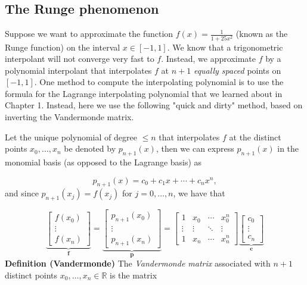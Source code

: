 \documentclass[12pt,a4paper]{article}
\def\bbR{ {\mathbb R} }
\begin{document}
\subsection{The Runge phenomenon}
Suppose we want to approximate the function $f(x) = \frac{1}{1 + 25x^2}$ (known as the Runge function) on the interval $x \in[-1, 1]$.  We know that a trigonometric interpolant will not converge very fast to $f$.  Instead, we approximate $f$ by a polynomial interpolant that interpolates $f$ at $n+1$ \emph{equally spaced} points on $[-1, 1]$.  One method to compute the interpolating polynomial is to use the formula for the Lagrange interpolating polynomial that we learned about in Chapter 1.  Instead, here we use the following "quick and dirty" method, based on inverting the Vandermonde matrix. 

Let the unique polynomial of degree $\leq n$ that interpolates $f$ at the distinct points $x_0, \ldots, x_{n}$ be denoted by $p_{n+1}(x)$, then we can express $p_{n+1}(x)$ in the monomial basis (as opposed to the Lagrange basis) as 

\[
p_{n+1}(x) = c_0 + c_1 x + \cdots + c_nx^n,
\]
and since $p_{n+1}(x_j) = f(x_j)$ for $j = 0, \ldots, n$, we have that

\[
\underbrace{\begin{bmatrix}
                    f(x_0) \\
                    \vdots \\
                    f(x_n)
                    \end{bmatrix}}_{\mathbf{f}} = 
\underbrace{ \begin{bmatrix}
                    p_{n+1}(x_0) \\
                    \vdots \\
                    p_{n+1}(x_n)
                    \end{bmatrix}}_{\mathbf{p}} = 
\begin{bmatrix} 1 & x_0 & \ensuremath{\cdots} & x_0^{n} \\
                    \ensuremath{\vdots} & \ensuremath{\vdots} & \ensuremath{\ddots} & \ensuremath{\vdots} \\
                    1 & x_n & \ensuremath{\cdots} & x_n^{n}
                    \end{bmatrix}
                    \underbrace{\begin{bmatrix}
                    c_0 \\
                    \vdots \\
                    c_n
                    \end{bmatrix}}_{\mathbf{c}}
\]
\textbf{Definition (Vandermonde)} The \emph{Vandermonde matrix} associated with $n+1$ distinct points $x_0,\ensuremath{\ldots},x_n \ensuremath{\in} \ensuremath{\bbR}$ is the matrix
\end{document}
